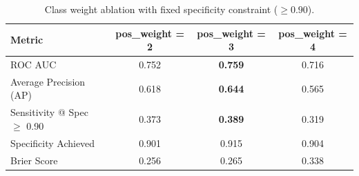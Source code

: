 \begin{table}[h]
\centering
\caption{Class weight ablation with fixed specificity constraint ($\geq 0.90$).}
\label{tab:class_weight_ablation}
\begin{tabular}{lccc}
\hline
\textbf{Metric} & \textbf{pos\_weight = 2} & \textbf{pos\_weight = 3} & \textbf{pos\_weight = 4} \\
\hline
ROC AUC & 0.752 & \textbf{0.759} & 0.716 \\
Average Precision (AP) & 0.618 & \textbf{0.644} & 0.565 \\
Sensitivity @ Spec $\geq$ 0.90 & 0.373 & \textbf{0.389} & 0.319 \\
Specificity Achieved & 0.901 & 0.915 & 0.904 \\
Brier Score & 0.256 & 0.265 & 0.338 \\
\hline
\end{tabular}
\end{table}
